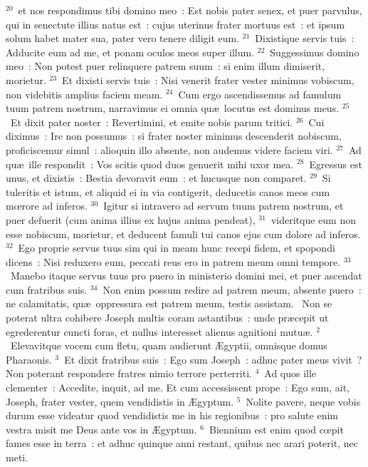 ${}^{20}$~et nos respondimus tibi domino meo~: Est nobis pater senex, et puer parvulus, qui in senectute illius natus est~: cujus uterinus frater mortuus est~: et ipsum solum habet mater sua, pater vero tenere diligit eum.
${}^{21}$~Dixistique servis tuis~: Adducite eum ad me, et ponam oculos meos super illum.
${}^{22}$~Suggessimus domino meo~: Non potest puer relinquere patrem suum~: si enim illum dimiserit, morietur.
${}^{23}$~Et dixisti servis tuis~: Nisi venerit frater vester minimus vobiscum, non videbitis amplius faciem meam.
${}^{24}$~Cum ergo ascendissemus ad famulum tuum patrem nostrum, narravimus ei omnia qu\ae\ locutus est dominus meus.
${}^{25}$~Et dixit pater noster~: Revertimini, et emite nobis parum tritici.
${}^{26}$~Cui diximus~: Ire non possumus~: si frater noster minimus descenderit nobiscum, proficiscemur simul~: alioquin illo absente, non audemus videre faciem viri.
${}^{27}$~Ad qu\ae\ ille respondit~: Vos scitis quod duos genuerit mihi uxor mea.
${}^{28}$~Egressus est unus, et dixistis~: Bestia devoravit eum~: et hucusque non comparet.
${}^{29}$~Si tuleritis et istum, et aliquid ei in via contigerit, deducetis canos meos cum mœrore ad inferos.
${}^{30}$~Igitur si intravero ad servum tuum patrem nostrum, et puer defuerit (cum anima illius ex hujus anima pendeat),
${}^{31}$~videritque eum non esse nobiscum, morietur, et deducent famuli tui canos ejus cum dolore ad inferos.
${}^{32}$~Ego proprie servus tuus sim qui in meam hunc recepi fidem, et spopondi dicens~: Nisi reduxero eum, peccati reus ero in patrem meum omni tempore.
${}^{33}$~Manebo itaque servus tuus pro puero in ministerio domini mei, et puer ascendat cum fratribus suis.
${}^{34}$~Non enim possum redire ad patrem meum, absente puero~: ne calamitatis, qu\ae\ oppressura est patrem meum, testis assistam.
~Non se poterat ultra cohibere Joseph multis coram astantibus~: unde pr\ae cepit ut egrederentur cuncti foras, et nullus interesset alienus agnitioni mutu\ae .
${}^{2}$~Elevavitque vocem cum fletu, quam audierunt \AE gyptii, omnisque domus Pharaonis.
${}^{3}$~Et dixit fratribus suis~: Ego sum Joseph~: adhuc pater meus vivit~? Non poterant respondere fratres nimio terrore perterriti.
${}^{4}$~Ad quos ille clementer~: Accedite, inquit, ad me. Et cum accessissent prope~: Ego sum, ait, Joseph, frater vester, quem vendidistis in \AE gyptum.
${}^{5}$~Nolite pavere, neque vobis durum esse videatur quod vendidistis me in his regionibus~: pro salute enim vestra misit me Deus ante vos in \AE gyptum.
${}^{6}$~Biennium est enim quod cœpit fames esse in terra~: et adhuc quinque anni restant, quibus nec arari poterit, nec meti.
